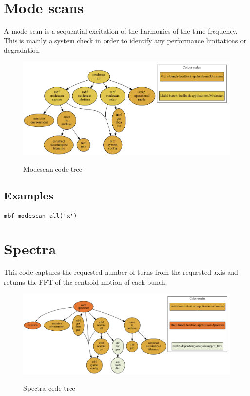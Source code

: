 \documentclass{report}
\begin{document}
\chapter{Mode scans}
A mode scan is a sequential excitation of the harmonics of the tune frequency. This is mainly a system check in order to identify any performance limitations or degradation.
\begin{figure}[hbt]
\begin{center}
  \includegraphics[width=\textwidth]{modscan_all.pdf}\\
  \caption{Modescan code tree}\label{fig:code_tree_modescan}
\end{center}
\end{figure}

\section{Examples}

\begin{verbatim}
mbf_modescan_all('x')
\end{verbatim}


\chapter{Spectra}
This code captures the requested number of turns from the requested axis and returns the FFT of the centroid motion of each bunch.

\begin{figure}[hbt]
\begin{center}
  \includegraphics[width=\textwidth]{mbf_spectrum.pdf}\\
  \caption{Spectra code tree}\label{fig:code_tree_spectrum}
\end{center}
\end{figure}
\end{document}
